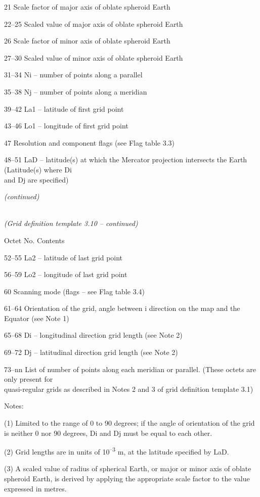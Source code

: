 21 Scale factor of major axis of oblate spheroid Earth

22--25 Scaled value of major axis of oblate spheroid Earth

26 Scale factor of minor axis of oblate spheroid Earth

27--30 Scaled value of minor axis of oblate spheroid Earth

31--34 Ni -- number of points along a parallel

35--38 Nj -- number of points along a meridian

39--42 La1 -- latitude of first grid point

43--46 Lo1 -- longitude of first grid point

47 Resolution and component flags (see Flag table 3.3)

48--51 LaD -- latitude(s) at which the Mercator projection intersects the Earth (Latitude(s) where Di\\
and Dj are specified)

\emph{(continued)}

\emph{\\
(Grid definition template 3.10 -- continued)}

Octet No. Contents

52--55 La2 -- latitude of last grid point

56--59 Lo2 -- longitude of last grid point

60 Scanning mode (flags -- see Flag table 3.4)

61--64 Orientation of the grid, angle between i direction on the map and the Equator (see Note 1)

65--68 Di -- longitudinal direction grid length (see Note 2)

69--72 Dj -- latitudinal direction grid length (see Note 2)

73--nn List of number of points along each meridian or parallel. (These octets are only present for\\
quasi-regular grids as described in Notes 2 and 3 of grid definition template 3.1)

Notes:

(1) Limited to the range of 0 to 90 degrees; if the angle of orientation of the grid is neither 0 nor 90 degrees, Di and Dj must be equal to each other.

(2) Grid lengths are in units of 10\textsuperscript{--3} m, at the latitude specified by LaD.

(3) A scaled value of radius of spherical Earth, or major or minor axis of oblate spheroid Earth, is derived by applying the appropriate scale factor to the value expressed in metres.

